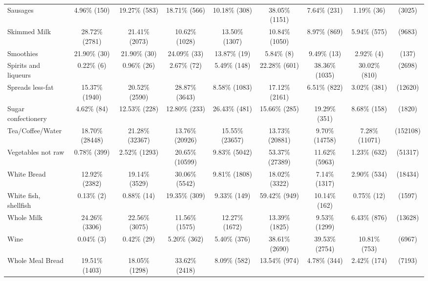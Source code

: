 \documentclass[utf8]{frontiers_suppmat} %
\begin{document}
\begin{table}[]
{\begin{tabular}{@{}lcccccccc@{}}
Sausages                  & 4.96\%    (150)  & 19.27\%    (583) & 18.71\%    (566) & 10.18\%   (308) & 38.05\%   (1151) & 7.64\%   (231)  & 1.19\%    (36)  &    (3025) \\
Skimmed Milk              & 28.72\%   (2781) & 21.41\%   (2073) & 10.62\%   (1028) & 13.50\%  (1307) & 10.84\%   (1050) & 8.97\%   (869)  & 5.94\%   (575)  &    (9683) \\
Smoothies                 & 21.90\%     (30) & 21.90\%     (30) & 24.09\%     (33) & 13.87\%    (19) & 5.84\%      (8)  & 9.49\%    (13)  & 2.92\%     (4)  &     (137) \\
Spirits and liqueurs      & 0.22\%      (6)  & 0.96\%     (26)  & 2.67\%     (72)  & 5.49\%   (148)  & 22.28\%    (601) & 38.36\%  (1035) & 30.02\%   (810) &    (2698) \\
Spreads less-fat          & 15.37\%   (1940) & 20.52\%   (2590) & 28.87\%   (3643) & 8.58\%  (1083)  & 17.12\%   (2161) & 6.51\%   (822)  & 3.02\%   (381)  &   (12620) \\
Sugar confectionery       & 4.62\%     (84)  & 12.53\%    (228) & 12.80\%    (233) & 26.43\%   (481) & 15.66\%    (285) & 19.29\%   (351) & 8.68\%   (158)  &    (1820) \\
Tea/Coffee/Water          & 18.70\%  (28448) & 21.28\%  (32367) & 13.76\%  (20926) & 15.55\% (23657) & 13.73\%  (20881) & 9.70\% (14758)  & 7.28\% (11071)  &  (152108) \\
Vegetables not raw        & 0.78\%    (399)  & 2.52\%   (1293)  & 20.65\%  (10599) & 9.83\%  (5042)  & 53.37\%  (27389) & 11.62\%  (5963) & 1.23\%   (632)  &   (51317) \\
White Bread               & 12.92\%   (2382) & 19.14\%   (3529) & 30.06\%   (5542) & 9.81\%  (1808)  & 18.02\%   (3322) & 7.14\%  (1317)  & 2.90\%   (534)  &   (18434) \\
White fish, shellfish     & 0.13\%      (2)  & 0.88\%     (14)  & 19.35\%    (309) & 9.33\%   (149)  & 59.42\%    (949) & 10.14\%   (162) & 0.75\%    (12)  &    (1597) \\
Whole Milk                & 24.26\%   (3306) & 22.56\%   (3075) & 11.56\%   (1575) & 12.27\%  (1672) & 13.39\%   (1825) & 9.53\%  (1299)  & 6.43\%   (876)  &   (13628) \\
Wine                      & 0.04\%      (3)  & 0.42\%     (29)  & 5.20\%    (362)  & 5.40\%   (376)  & 38.61\%   (2690) & 39.53\%  (2754) & 10.81\%   (753) &    (6967) \\
Whole Meal Bread          & 19.51\%   (1403) & 18.05\%   (1298) & 33.62\%   (2418) & 8.09\%   (582)  & 13.54\%    (974) & 4.78\%   (344)  & 2.42\%   (174)  &    (7193) \\

\end{tabular}}
\end{table}
\end{document}
